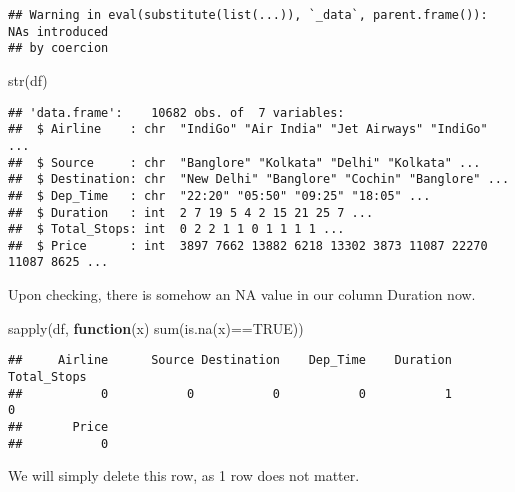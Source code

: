 \documentclass[
]{article}
\newenvironment{Shaded}{\begin{snugshade}}{\end{snugshade}}
\newcommand{\ConstantTok}[1]{\textcolor[rgb]{0.00,0.00,0.00}{#1}}
\newcommand{\ControlFlowTok}[1]{\textcolor[rgb]{0.13,0.29,0.53}{\textbf{#1}}}
\newcommand{\FunctionTok}[1]{\textcolor[rgb]{0.00,0.00,0.00}{#1}}
\newcommand{\NormalTok}[1]{#1}
\newcommand{\OtherTok}[1]{\textcolor[rgb]{0.56,0.35,0.01}{#1}}
\newcommand{\SpecialCharTok}[1]{\textcolor[rgb]{0.00,0.00,0.00}{#1}}
\begin{document}
\begin{verbatim}
## Warning in eval(substitute(list(...)), `_data`, parent.frame()): NAs introduced
## by coercion
\end{verbatim}

\begin{Shaded}
\begin{Highlighting}[]
\FunctionTok{str}\NormalTok{(df)}
\end{Highlighting}
\end{Shaded}

\begin{verbatim}
## 'data.frame':    10682 obs. of  7 variables:
##  $ Airline    : chr  "IndiGo" "Air India" "Jet Airways" "IndiGo" ...
##  $ Source     : chr  "Banglore" "Kolkata" "Delhi" "Kolkata" ...
##  $ Destination: chr  "New Delhi" "Banglore" "Cochin" "Banglore" ...
##  $ Dep_Time   : chr  "22:20" "05:50" "09:25" "18:05" ...
##  $ Duration   : int  2 7 19 5 4 2 15 21 25 7 ...
##  $ Total_Stops: int  0 2 2 1 1 0 1 1 1 1 ...
##  $ Price      : int  3897 7662 13882 6218 13302 3873 11087 22270 11087 8625 ...
\end{verbatim}

Upon checking, there is somehow an NA value in our column Duration now.

\begin{Shaded}
\begin{Highlighting}[]
\FunctionTok{sapply}\NormalTok{(df, }\ControlFlowTok{function}\NormalTok{(x) }\FunctionTok{sum}\NormalTok{(}\FunctionTok{is.na}\NormalTok{(x)}\SpecialCharTok{==}\ConstantTok{TRUE}\NormalTok{))}
\end{Highlighting}
\end{Shaded}

\begin{verbatim}
##     Airline      Source Destination    Dep_Time    Duration Total_Stops 
##           0           0           0           0           1           0 
##       Price 
##           0
\end{verbatim}

We will simply delete this row, as 1 row does not matter.

\begin{Shaded}
\end{Shaded}
\end{document}
